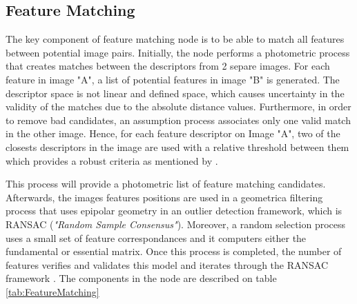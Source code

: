\documentclass[12pt]{report}
\begin{document}
\subsection{Feature Matching}
The key component of feature matching node is to be able to match all features between potential image pairs.
Initially, the node performs a photometric process that creates matches between the descriptors from 2 separe images. For each feature in image "A", a list of potential features in image "B" is generated.
The descriptor space is not linear and defined space, which causes uncertainty in the validity of the matches due to the absolute distance values. 
Furthermore, in order to remove bad candidates, an assumption process associates only one valid match in the other image.
Hence, for each feature descriptor on Image "A", two of the closests descriptors in the image are used with a relative threshold between them which provides a robust criteria as mentioned by .

This process will provide a photometric list of feature matching candidates. Afterwards, the images features positions are used in a geometrica
filtering process that uses epipolar geometry in an outlier detection framework, which is RANSAC (\textit{"Random Sample Consensus"}).
Moreover, a random selection process uses a small set of feature correspondances and it computers either the fundamental or essential matrix. 
Once this process is completed, the number of features verifies and validates this model and iterates through the RANSAC framework .
\enlargethispage{\baselineskip}
The components in the node are described on table \ref{tab:FeatureMatching}
\end{document}
